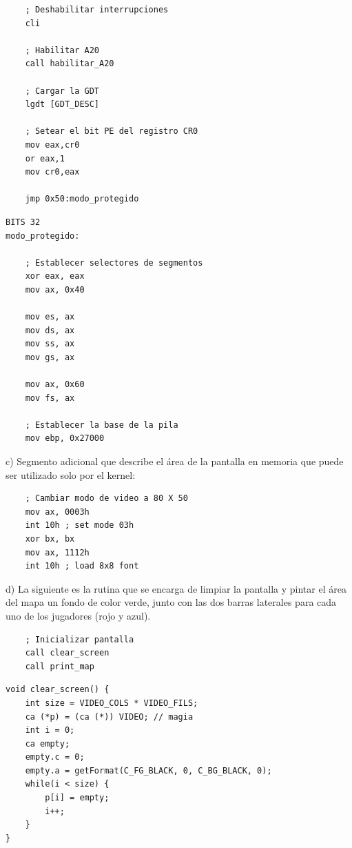 \documentclass[a4paper]{article}
\begin{document}
\begin{codesnippet}
\begin{verbatim}
    ; Deshabilitar interrupciones
    cli
  
    ; Habilitar A20
    call habilitar_A20
	
    ; Cargar la GDT
    lgdt [GDT_DESC]

    ; Setear el bit PE del registro CR0
    mov eax,cr0
    or eax,1
    mov cr0,eax

    jmp 0x50:modo_protegido
\end{verbatim}
\end{codesnippet}
\begin{codesnippet}
\begin{verbatim}
BITS 32
modo_protegido:

    ; Establecer selectores de segmentos
    xor eax, eax
    mov ax, 0x40
     
    mov es, ax
    mov ds, ax
    mov ss, ax    
    mov gs, ax

    mov ax, 0x60 
    mov fs, ax
    
    ; Establecer la base de la pila
    mov ebp, 0x27000
\end{verbatim}
\end{codesnippet}

{\large c)} Segmento adicional que describe el \'area de la pantalla en memoria que puede
ser utilizado solo por el kernel:
\begin{codesnippet}
\begin{verbatim}
    ; Cambiar modo de video a 80 X 50
    mov ax, 0003h
    int 10h ; set mode 03h
    xor bx, bx
    mov ax, 1112h
    int 10h ; load 8x8 font
\end{verbatim}
\end{codesnippet}


{\large d)} La siguiente es la rutina que se encarga de limpiar la pantalla y pintar el \'area del mapa
un fondo de color verde, junto con las dos barras laterales para cada uno de
los jugadores (rojo y azul).
\begin{codesnippet}
\begin{verbatim}
    ; Inicializar pantalla
    call clear_screen
    call print_map
\end{verbatim}
\end{codesnippet}
\begin{codesnippet}
\begin{verbatim}
void clear_screen() {
    int size = VIDEO_COLS * VIDEO_FILS;    
    ca (*p) = (ca (*)) VIDEO; // magia
    int i = 0;
    ca empty;
    empty.c = 0;
    empty.a = getFormat(C_FG_BLACK, 0, C_BG_BLACK, 0);
    while(i < size) {
        p[i] = empty;
        i++;
    }
}
\end{verbatim}
\end{codesnippet}
\end{document}
